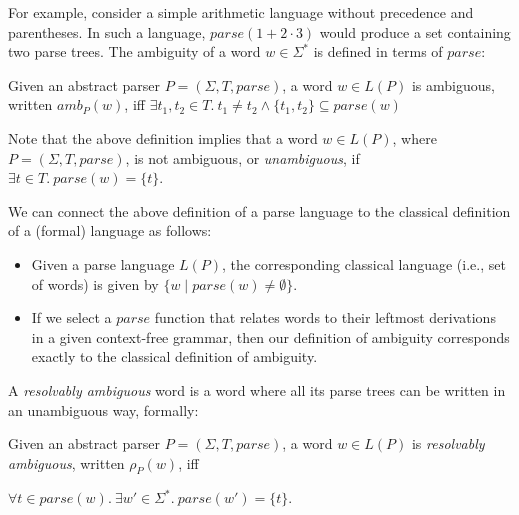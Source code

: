 \documentclass[acmsmall,review,anonymous]{acmart}\settopmatter{printfolios=true,printccs=false,printacmref=false}
\newcommand{\T}{\Sigma} %
\newcommand{\parse}{\mathit{parse}} %
\newcommand{\amb}{\mathit{amb}}
\begin{document}
\noindent For example, consider a simple arithmetic language without precedence and parentheses. In such a language, $\parse(1 + 2 \cdot 3)$ would produce a set containing two parse trees. %
%
%
The ambiguity of a word $w \in \T^{*}$ is defined in terms of $\parse$:

\begin{definition}
  Given an abstract parser $P = (\T, T, \parse)$, a word $w \in L(P)$
  is ambiguous, written $\amb_P(w)$, iff
%
  $\exists t_1, t_2 \in T.\ t_1 \neq t_2 \land \{t_1, t_2\} \subseteq \parse(w)$
\end{definition}

\noindent
Note that the above definition implies that a word $w \in L(P)$, where
$P = (\T, T, \parse)$, is not ambiguous, or \emph{unambiguous}, if
$\exists t \in T.\ \parse(w) = \{t\}$.

We can connect the above definition of a parse language to the
classical definition of a (formal) language as follows:

\begin{itemize}
\item Given a parse language $L(P)$, the corresponding classical language (i.e., set of words) is given by $\{ w \mid \parse(w) \neq \emptyset \}$.
\item If we select a $\parse$ function that relates words to their leftmost derivations in a given context-free grammar, then our definition of ambiguity corresponds exactly to the classical definition of ambiguity.
\end{itemize}

\noindent A \emph{resolvably ambiguous} word is a word where all its parse trees can be written in an unambiguous way, formally:

\begin{definition}\label{def:resolvable-word}
  Given an abstract parser $P = (\T, T, \parse)$, a word $w \in L(P)$ is \emph{resolvably ambiguous}, written $\rho_P(w)$, iff

  $\forall t \in \parse(w).\ \exists w' \in \T^{*}.\ \parse(w') = \{t\}$.
\end{definition}
\end{document}
